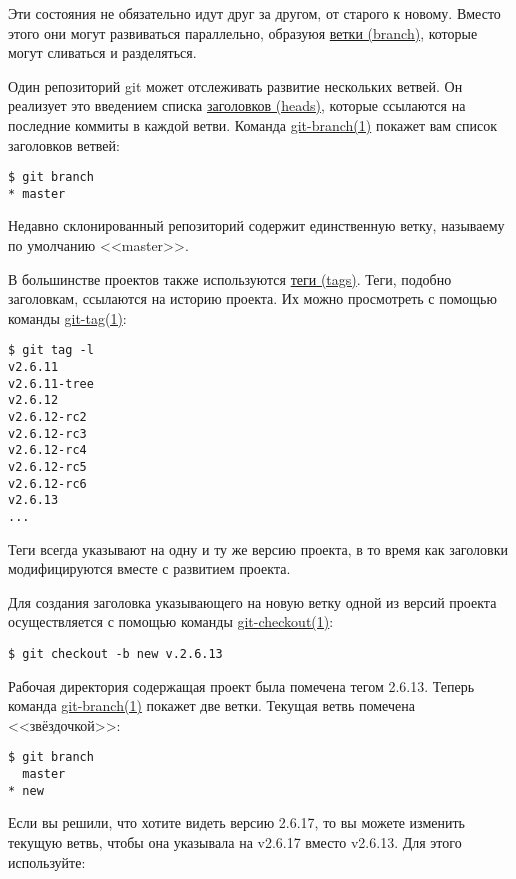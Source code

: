 \documentclass[a4paper, 12pt]{report}
\begin{document}
Эти состояния не обязательно идут друг за другом, от старого к новому. Вместо этого
они могут развиваться параллельно, образуюя \href{#def_branch}{ветки (branch)},
которые могут сливаться и разделяться.

Один репозиторий git может отслеживать развитие нескольких ветвей. Он реализует это
введением списка \href{#def_head}{заголовков (heads)}, которые ссылаются на
последние коммиты в каждой ветви. Команда \href{http://www.kernel.org/pub/software/scm/git/docs/git-branch.html}{git-branch(1)}
покажет вам список заголовков ветвей:

\begin{lstlisting}
$ git branch
* master
\end{lstlisting}

Недавно склонированный репозиторий содержит единственную ветку, называему по умолчанию
<<master>>.

В большинстве проектов также используются \href{#def_tag}{теги (tags)}. Теги, подобно
заголовкам, ссылаются на историю проекта. Их можно просмотреть с помощью команды
\href{http://www.kernel.org/pub/software/scm/git/docs/git-tag.html}{git-tag(1)}:

\begin{lstlisting}
$ git tag -l
v2.6.11
v2.6.11-tree
v2.6.12
v2.6.12-rc2
v2.6.12-rc3
v2.6.12-rc4
v2.6.12-rc5
v2.6.12-rc6
v2.6.13
...
\end{lstlisting}

Теги всегда указывают на одну и ту же версию проекта, в то время как заголовки
модифицируются вместе с развитием проекта.

Для создания заголовка указывающего на новую ветку одной из версий проекта
осуществляется с помощью команды
\href{http://www.kernel.org/pub/software/scm/git/docs/git-checkout.html}{git-checkout(1)}:

\begin{lstlisting}
$ git checkout -b new v.2.6.13
\end{lstlisting}

Рабочая директория содержащая проект была помечена тегом 2.6.13. Теперь команда
\href{http://www.kernel.org/pub/software/scm/git/docs/git-branch.html}{git-branch(1)}
покажет две ветки. Текущая ветвь помечена <<звёздочкой>>:

\begin{lstlisting}
$ git branch
  master
* new
\end{lstlisting}

Если вы решили, что хотите видеть версию 2.6.17, то вы можете изменить текущую ветвь,
чтобы она указывала на v2.6.17 вместо v2.6.13. Для этого используйте:
\end{document}
